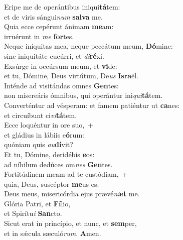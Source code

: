 \evenverse Eripe me de operántibus iniqui\textbf{tá}tem:~\*\\
\evenverse et de viris sángui\textit{num} \textbf{sal}\textbf{va} me.\\
\oddverse Quia ecce cepérunt ánimam \textbf{me}am:~\*\\
\oddverse irruérunt in \textit{me} \textbf{for}tes.\\
\evenverse Neque iníquitas mea, neque peccátum meum, \textbf{Dó}mine:~\*\\
\evenverse sine iniquitáte cucúrri, et \textit{di}\textbf{ré}xi.\\
\oddverse Exsúrge in occúrsum meum, et \textbf{vi}de:~\*\\
\oddverse et tu, Dómine, Deus virtútum, De\textit{us} \textbf{Is}\textbf{ra}ël.\\
\evenverse Inténde ad visitándas omnes \textbf{Gen}tes:~\*\\
\evenverse non misereáris ómnibus, qui operántur ini\textit{qui}\textbf{tá}tem.\\
\oddverse Converténtur ad vésperam: et famem patiéntur ut \textbf{ca}nes:~\*\\
\oddverse et circuíbunt ci\textit{vi}\textbf{tá}tem.\\
\evenverse Ecce loquéntur in ore suo,~+\\
\evenverse  et gládius in lábiis e\textbf{ó}rum:~\*\\
\evenverse quóniam quis \textit{au}\textbf{dí}vit?\\
\oddverse Et tu, Dómine, deridébis \textbf{e}os:~\*\\
\oddverse ad níhilum dedúces om\textit{nes} \textbf{Gen}tes.\\
\evenverse Fortitúdinem meam ad te custódiam,~+\\
\evenverse  quia, Deus, suscéptor \textbf{me}us es:~\*\\
\evenverse Deus meus, misericórdia ejus prævé\textit{ni}\textbf{et} me.\\
\oddverse Glória Patri, et \textbf{Fí}lio,~\*\\
\oddverse et Spirítu\textit{i} \textbf{San}cto.\\
\evenverse Sicut erat in princípio, et nunc, et \textbf{sem}per,~\*\\
\evenverse et in sǽcula sæculó\textit{rum}. \textbf{A}men.\\
